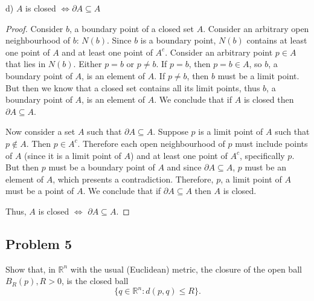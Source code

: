 \documentclass{article}
\begin{document}
\begin{tcolorbox}
d) $A$ is closed $\iff \partial A \subseteq A$ 
\end{tcolorbox}

\begin{proof}
Consider $b$, a boundary point of a closed set $A$. Consider an arbitrary open neighbourhood of $b$: $N(b)$. Since $b$ is a boundary point, $N(b)$ contains at least one point of $A$ and at least one point of $A^c$. Consider an arbitrary point $p \in A$ that lies in $N(b)$. Either $p = b$ or $p \neq b$. If $p = b$, then $p = b \in A$, so $b$, a boundary point of $A$, is an element of $A$. If $p \neq b$, then $b$ must be a limit point. But then we know that a closed set contains all its limit points, thus $b$, a boundary point of $A$, is an element of $A$. We conclude that if $A$ is closed then $\partial A \subseteq A$.

Now consider a set $A$ such that $\partial A \subseteq A$. Suppose $p$ is a limit point of $A$ such that $p \notin A$. Then $p \in A^c$. Therefore each open neighbourhood of $p$ must include points of $A$ (since it is a limit point of $A$) and at least one point of $A^c$, specifically $p$. But then $p$ must be a boundary point of $A$ and since $\partial A \subseteq A$, $p$ must be an element of $A$, which presents a contradiction. Therefore, $p$, a limit point of $A$ must be a point of $A$. We conclude that if $\partial A \subseteq A$ then $A$ is closed.

Thus, $A$ is closed $\iff$ $\partial A \subseteq A$.
\end{proof}

\subsection*{Problem 5}

\begin{tcolorbox}
Show that, in $\mathbb{R}^n$ with the usual (Euclidean) metric, the closure of the open ball $B_R(p),
R > 0$, is the closed ball
$$ \{ q \in \mathbb{R}^n : d(p ,q) \leq R \}. $$
\end{tcolorbox}
\end{document}
